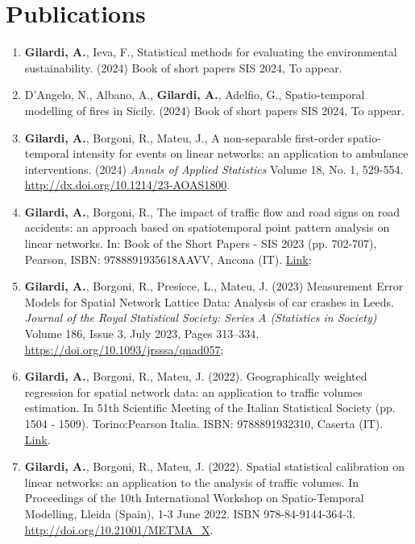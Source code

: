 \documentclass[11pt,a4paper,sans]{moderncv}
\begin{document}
  \section{Publications}
  \begin{enumerate}
  \item \textbf{Gilardi, A.}, Ieva, F., Statistical methods for evaluating the environmental sustainability. (2024) Book of short papers SIS 2024, To appear. 
  \item D'Angelo, N., Albano, A., \textbf{Gilardi, A.}, Adelfio, G., Spatio-temporal modelling of fires in Sicily. (2024) Book of short papers SIS 2024, To appear.
  \item \textbf{Gilardi, A.}, Borgoni, R., Mateu, J., A non-separable first-order spatio-temporal intensity for events on linear networks: an application to ambulance interventions. (2024) \textit{Annals of Applied Statistics} Volume 18, No. 1, 529-554. \url{http://dx.doi.org/10.1214/23-AOAS1800}.
  \item \textbf{Gilardi, A.}, Borgoni, R., The impact of traffic flow and road signs on road accidents: an approach based on spatiotemporal point pattern analysis on linear networks. In: Book of the Short Papers - SIS 2023 (pp. 702-707), Pearson, ISBN: 9788891935618AAVV, Ancona (IT). \href{https://it.pearson.com/content/dam/region-core/italy/pearson-italy/pdf/Docenti/Universit%C3%A0/bozza-book-compresso.pdf}{Link};  
  \item \textbf{Gilardi, A.}, Borgoni, R., Presicce, L., Mateu, J. (2023) Measurement Error Models for Spatial Network Lattice Data: Analysis of car crashes in Leeds. \textit{Journal of the Royal Statistical Society: Series A (Statistics in Society)} Volume 186, Issue 3, July 2023, Pages 313–334, \url{https://doi.org/10.1093/jrsssa/qnad057};
  \item \textbf{Gilardi, A.}, Borgoni, R., Mateu, J. (2022). Geographically weighted regression for spatial
  network data: an application to traffic volumes
  estimation. In 51th Scientific Meeting of the Italian Statistical Society (pp. 1504 - 1509). Torino:Pearson Italia. ISBN: 9788891932310, Caserta (IT). \href{https://it.pearson.com/content/dam/region-core/italy/pearson-italy/pdf/Docenti/Universit%C3%A0/Sis-2022-4c-low.pdf}{Link}. 
  \item \textbf{Gilardi, A.}, Borgoni, R., Mateu, J. (2022). Spatial statistical calibration on linear networks: an application to the analysis of traffic volumes. In Proceedings of the 10th International Workshop on Spatio-Temporal Modelling, Lleida (Spain), 1-3 June 2022. ISBN 978-84-9144-364-3. \url{http://doi.org/10.21001/METMA\_X}. 

\end{enumerate}
\end{document}
